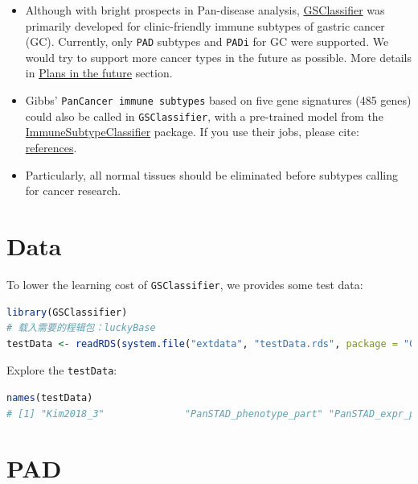 \documentclass[
  12pt,
]{book}
\newcommand{\passthrough}[1]{#1}
\providecommand{\tightlist}{%
  \setlength{\itemsep}{0pt}\setlength{\parskip}{0pt}}
\begin{document}
\begin{itemize}
\tightlist
\item
  Although with bright prospects in Pan-disease analysis, \href{https://github.com/huangwb8/GSClassifier}{GSClassifier} was primarily developed for clinic-friendly immune subtypes of gastric cancer (GC). Currently, only \passthrough{\lstinline!PAD!} subtypes and \passthrough{\lstinline!PADi!} for GC were supported. We would try to support more cancer types in the future as possible. More details in \href{https://github.com/huangwb8/GSClassifier/wiki/Plans-in-the-future}{Plans in the future} section.
\item
  Gibbs' \passthrough{\lstinline!PanCancer immune subtypes!} based on five gene signatures (485 genes) could also be called in \passthrough{\lstinline!GSClassifier!}, with a pre-trained model from the \href{https://github.com/CRI-iAtlas/ImmuneSubtypeClassifier}{ImmuneSubtypeClassifier} package. If you use their jobs, please cite: \href{https://github.com/huangwb8/GSClassifier/wiki/Introduction\#Reference}{references}.
\item
  Particularly, all normal tissues should be eliminated before subtypes calling for cancer research.
\end{itemize}

\hypertarget{data}{%
\section{Data}\label{data}}

To lower the learning cost of \passthrough{\lstinline!GSClassifier!}, we provides some test data:

\begin{lstlisting}[language=R]
library(GSClassifier)
# 载入需要的程辑包：luckyBase
testData <- readRDS(system.file("extdata", "testData.rds", package = "GSClassifier"))
\end{lstlisting}

Explore the \passthrough{\lstinline!testData!}:

\begin{lstlisting}[language=R]
names(testData)
# [1] "Kim2018_3"              "PanSTAD_phenotype_part" "PanSTAD_expr_part"
\end{lstlisting}

\hypertarget{pad}{%
\section{PAD}\label{pad}}
\end{document}
